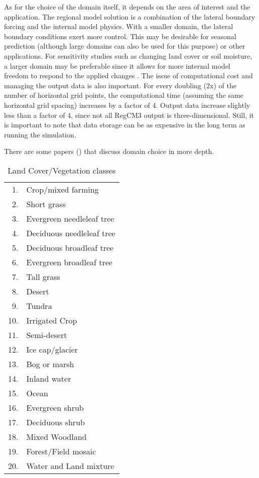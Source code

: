 As for the choice of the
domain itself, it depends on the area of interest and the application.
The regional model solution is a combination of the lateral boundary
forcing and the internal model physics. With a smaller domain, the
lateral boundary conditions exert more control. This may be desirable
for seasonal prediction (although large domains can also be used for this purpose) or other applications. For sensitivity studies
such as changing land cover or soil moisture, a larger domain may be
preferable since it allows for more internal model freedom to respond to
the applied changes \citep{Seth_98}. The issue of computational cost and managing the
output data is also important. For every doubling (2x) of the number of horizontal grid points, the computational time (assuming the same horizontal grid spacing) increases by a factor of 4. Output data increase slightly less than a factor of 4, since not all RegCM3 output is three-dimensional. Still, it is important to note that data storage can be as expensive in the long term as running the simulation. 

There are some papers (\citet{Seth_98,Vannitsem_05,Rauscher_06a})
that discuss domain choice in more depth.


\begin{table}
\begin{center}
\caption{Land Cover/Vegetation classes} \label{VegTypes}
\begin{tabular}{rl}
\hline\hline
1.&Crop/mixed farming\\
2.&Short grass\\
3.&Evergreen needleleaf tree\\
4.&Deciduous needleleaf tree\\
5.&Deciduous broadleaf tree\\
6.&Evergreen broadleaf tree\\
7.&Tall grass\\
8.&Desert\\
9.&Tundra\\
10.&Irrigated Crop\\
11.&Semi-desert\\
12.&Ice cap/glacier\\
13.&Bog or marsh\\
14.&Inland water\\
15.&Ocean\\
16.&Evergreen shrub\\
17.&Deciduous shrub\\
18.&Mixed Woodland\\
19.&Forest/Field mosaic \\
20.&Water and Land mixture \\
\hline\hline
\end{tabular}
\end{center}
\end{table}

